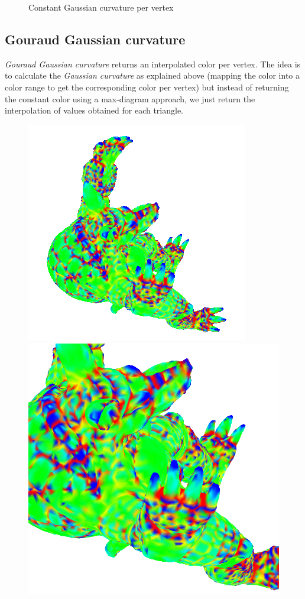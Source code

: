 \begin{figure}[!h]
    \endminipage
    \caption{Constant Gaussian curvature per vertex} \label{fig:gc-detail}
\end{figure}


\subsection{Gouraud Gaussian curvature}
\textit{Gouraud Gaussian curvature} returns an interpolated color per vertex. The idea is to calculate the \textit{Gaussian curvature} as explained above (mapping the color into a color range to get the corresponding color per vertex) but instead of returning the constant color using a max-diagram approach, we just return the interpolation of values obtained for each triangle.

\begin{figure}[!h]
    \centering
    \centering
    \includegraphics[scale=1.0]{images/gci-armadillo-top.png}
    \endminipage\hfill
    \centering
    \includegraphics[scale=0.4]{images/gci-detail-armadillo-top.png}

\end{figure}
